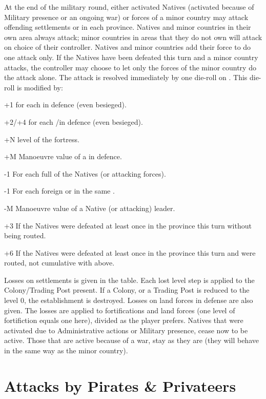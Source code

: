 \aparag At the end of the military round, either activated Natives (activated
because of Military presence or an ongoing war) or forces of a \ROTW minor
country may attack offending settlements \COL or \TP in each province. Natives
and minor countries in their own area always attack; minor countries in areas
that they do not own will attack on choice of their controller.
\bparag Natives and minor countries add their force to do one attack only.
\bparag If the Natives have been defeated this turn and a minor country
attacks, the controller may choose to let only the forces of the minor country
do the attack alone.
\aparag The attack is resolved immediately by one die-roll on
. This die-roll is modified by:
\begin{modlist}
\item[+1] for each \LD in defence (even besieged).
\item[+2/+4] for each \ARMY\facemoins/\Faceplus in defence (even besieged).
\item[+N] level of the fortress.
\item[+M] Manoeuvre value of a  in defence.
\item[-1] For each full \LD of the Natives (or attacking forces).
\item[-1] For each foreign \COL or \TP in the same \Area.
\item[-M] Manoeuvre value of a Native (or attacking) leader.
\item[+3]If the Natives were defeated at least once in the province this turn
  without being routed.
\item[+6]If the Natives were defeated at least once in the province this turn
  and were routed, not cumulative with above.
\end{modlist}
\aparag Losses on settlements is given in the table. Each lost level step is
applied to the Colony/Trading Post present. If a Colony, or a Trading Post is
reduced to the level 0, the establishment is destroyed.
\aparag Losses on land forces in defense are also given. The losses are
applied to fortifications and land forces (one level of fortifiction equals
one \LD here), divided as the player prefers.
\aparag Natives that were activated due to Administrative actions or Military
presence, cease now to be active. Those that are active because of a war, stay
as they are (they will behave in the same way as the minor country).



\section{Attacks by Pirates \& Privateers}\label{chRedep:CorsairAttack}


